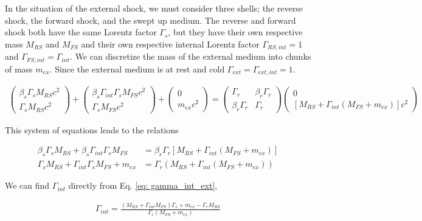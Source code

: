 \documentclass[linenumbers,twocolumn]{aastex631}
\begin{document}
\begin{appendix}
In the situation of the external shock, we must consider three shells; the reverse shock, the forward shock, and the swept up medium. The reverse and forward shock both have the same Lorentz factor $\Gamma_s$, but they have their own respective mass $M_{RS}$ and $M_{FS}$ and their own respective internal Lorentz factor $\Gamma_{RS,int} = 1$ and $\Gamma_{FS,int} = \Gamma_{int}$. We can discretize the mass of the external medium into chunks of mass $m_{ex}$. Since the external medium is at rest and cold $\Gamma_{ext} = \Gamma_{ext,int} = 1$.

\begin{align}
	\begin{pmatrix}
	\beta_s\Gamma_s M_{RS} c^2\\
	\Gamma_s M_{RS} c^2
	\end{pmatrix}
	+
	\begin{pmatrix}
	\beta_s\Gamma_{int}\Gamma_s M_{FS} c^2 \\
	\Gamma_s M_{FS} c^2
	\end{pmatrix}
	+
	\begin{pmatrix}
	0 \\
	m_{ex} c^2
	\end{pmatrix}
	=
	\begin{pmatrix}
	\Gamma_r & \beta_r\Gamma_r\\
	\beta_r\Gamma_r & \Gamma_r
	\end{pmatrix}
	\begin{pmatrix}
	0 \\
	[M_{RS} + \Gamma_{int}(M_{FS} + m_{ex}) ]c^2
	\end{pmatrix}
\end{align}

This system of equations leads to the relations

\begin{align}
	\beta_s\Gamma_sM_{RS} + \beta_s\Gamma_{int}\Gamma_sM_{FS} &= \beta_r\Gamma_r[M_{RS} + \Gamma_{int}(M_{FS}+m_{ex})] \label{eq: gamma_r_ext}\\
	\Gamma_sM_{RS} + \Gamma_{int}\Gamma_sM_{FS} + m_{ex} &= \Gamma_r (M_{RS} + \Gamma_{int}(M_{FS}+m_{ex})) \label{eq: gamma_int_ext}
\end{align}

We can find $\Gamma_{int}$ directly from Eq. \ref{eq: gamma_int_ext},

\begin{align}
	\Gamma_{int} = \frac{(M_{RS} + \Gamma_{int}M_{FS})\Gamma_s + m_{ex} - \Gamma_rM_{RS}}{\Gamma_r(M_{FS}+m_{ex})}
\end{align}


\end{appendix}
\end{document}
